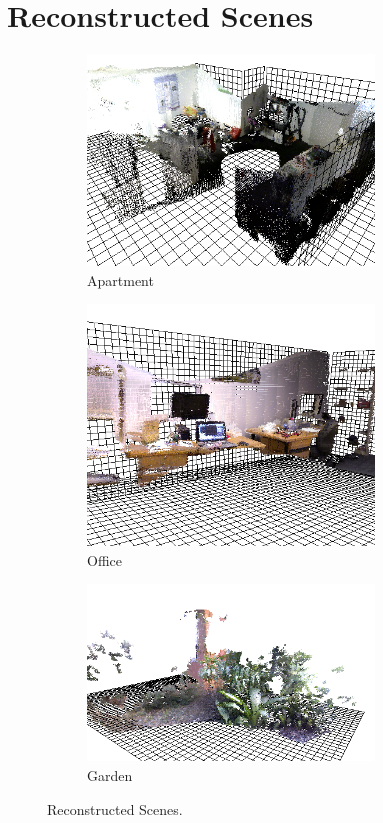 \section{Reconstructed Scenes}
\label{Sec:FVRQual1Exp}

\begin{figure}[!htb] 
        \centering
        \begin{subfigure}[b]{3.0in}
                \includegraphics[width=3.0in]{images/ch2/unit21}
                \caption{Apartment}
                \label{fig:RECON_UNIT}
        \end{subfigure}
        \begin{subfigure}[b]{3.0in}
                \includegraphics[width=3.0in]{images/ch2/officeA}
                \caption{Office}
                \label{fig:RECON_OFFICE}
        \end{subfigure}
        \begin{subfigure}[b]{3.0in}
                \includegraphics[width=3.0in]{images/ch2/outdoorA}
                \caption{Garden}
                \label{fig:RECON_GARDEN}
        \end{subfigure}
       \caption{Reconstructed Scenes.}
       \label{fig:RECONSTRUCTIONS}
\end{figure}

